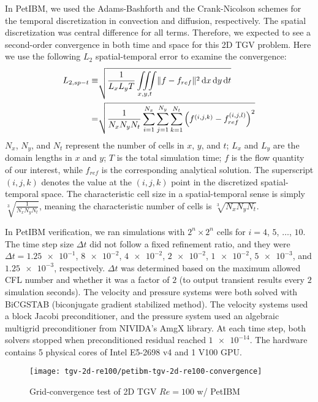 In PetIBM, we used the Adams-Bashforth and the Crank-Nicolson schemes for the temporal discretization in convection and diffusion, respectively.
The spatial discretization was central difference for all terms.
Therefore, we expected to see a second-order convergence in both time and space for this 2D TGV problem.
Here we use the following $L_2$ spatial-temporal error to examine the convergence:
\begin{equation}\label{eq:spt-err-def}
    \begin{aligned}
    L_{2,sp-t} \equiv &\sqrt{
        \frac{1}{L_x L_y T}
        \iiint\limits_{x, y, t} \lVert f - f_{ref} \rVert^2 \mathop{}\!\mathrm{d} x \mathop{}\!\mathrm{d} y \mathop{}\!\mathrm{d} t
    } \\
    = &
    \sqrt{\frac{1}{N_x N_y N_t}\sum\limits_{i=1}^{N_x}\sum\limits_{j=1}^{N_y}\sum\limits_{k=1}^{N_t}\left(f^{(i, j, k)} - f_{ref}^{(i, j, l)}\right)^2}
    \end{aligned}
\end{equation}
$N_x$, $N_y$, and $N_t$ represent the number of cells in $x$, $y$, and $t$;
$L_x$ and $L_y$ are the domain lengths in $x$ and $y$;
$T$ is the total simulation time;
$f$ is the flow quantity of our interest, while $f_{ref}$ is the corresponding analytical solution.
The superscript $(i, j, k)$ denotes the value at the $(i, j, k)$ point in the discretized spatial-temporal space.
The characteristic cell size in a spatial-temporal sense is simply $\sqrt[3]{\frac{1}{N_x N_y N_t}}$, meaning the characteristic number of cells is $\sqrt[3]{N_x N_y N_t}$.

In PetIBM verification, we ran simulations with $2^{n} \times 2^{n}$ cells for $i=4$, $5$, $\dots$, $10$.
The time step size $\Delta t$ did not follow a fixed refinement ratio, and they were $\Delta t = \num{1.25e-1}$, $\num{8e-2}$, $\num{4e-2}$, $\num{2e-2}$, $\num{1e-2}$, $\num{5e-3}$, and $\num{1.25e-3}$, respectively.
$\Delta t$ was determined based on the maximum allowed CFL number and whether it was a factor of $2$ (to output transient results every $\num{2}$ simulation seconds).
The velocity and pressure systems were both solved with BiCGSTAB (biconjugate gradient stabilized method).
The velocity systems used a block Jacobi preconditioner, and the pressure system used an algebraic multigrid preconditioner from NIVIDA's AmgX library.
At each time step, both solvers stopped when preconditioned residual reached $\num{1e-14}$.
The hardware contains 5 physical cores of Intel E5-2698 v4 and 1 V100 GPU.

\begin{figure}
    \centering%
    \texttt{[image: tgv-2d-re100/petibm-tgv-2d-re100-convergence]}%
    \caption{%
        Grid-convergence test of 2D TGV $Re=\num{100}$ w/ PetIBM
    }
    \label{fig:tgv-petibm-convergence}%
\end{figure}

